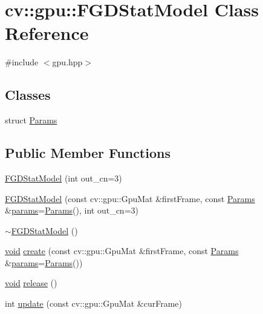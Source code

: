 \hypertarget{classcv_1_1gpu_1_1FGDStatModel}{\section{cv\-:\-:gpu\-:\-:F\-G\-D\-Stat\-Model Class Reference}
\label{classcv_1_1gpu_1_1FGDStatModel}
}


{\ttfamily \#include $<$gpu.\-hpp$>$}

\subsection*{Classes}
\begin{DoxyCompactItemize}
\item 
struct \hyperlink{structcv_1_1gpu_1_1FGDStatModel_1_1Params}{Params}
\end{DoxyCompactItemize}
\subsection*{Public Member Functions}
\begin{DoxyCompactItemize}
\item 
\hyperlink{classcv_1_1gpu_1_1FGDStatModel_a44f2f3e939a21b4978b7399ce706335d}{F\-G\-D\-Stat\-Model} (int out\-\_\-cn=3)
\item 
\hyperlink{classcv_1_1gpu_1_1FGDStatModel_a1941766a912afc498ff76807aa4dad68}{F\-G\-D\-Stat\-Model} (const cv\-::gpu\-::\-Gpu\-Mat \&first\-Frame, const \hyperlink{structcv_1_1gpu_1_1FGDStatModel_1_1Params}{Params} \&\hyperlink{compat_8hpp_a0480a03ecc41b20cde376602531d9270}{params}=\hyperlink{structcv_1_1gpu_1_1FGDStatModel_1_1Params}{Params}(), int out\-\_\-cn=3)
\item 
\hyperlink{classcv_1_1gpu_1_1FGDStatModel_ab2d4c63fcc1df838e6311ac5e423c1b4}{$\sim$\-F\-G\-D\-Stat\-Model} ()
\item 
\hyperlink{legacy_8hpp_a8bb47f092d473522721002c86c13b94e}{void} \hyperlink{classcv_1_1gpu_1_1FGDStatModel_ad01cae89012281d70c63ec698974ce35}{create} (const cv\-::gpu\-::\-Gpu\-Mat \&first\-Frame, const \hyperlink{structcv_1_1gpu_1_1FGDStatModel_1_1Params}{Params} \&\hyperlink{compat_8hpp_a0480a03ecc41b20cde376602531d9270}{params}=\hyperlink{structcv_1_1gpu_1_1FGDStatModel_1_1Params}{Params}())
\item 
\hyperlink{legacy_8hpp_a8bb47f092d473522721002c86c13b94e}{void} \hyperlink{classcv_1_1gpu_1_1FGDStatModel_a16e796b802d2bf74d5591fce51fa91fa}{release} ()
\item 
int \hyperlink{classcv_1_1gpu_1_1FGDStatModel_af488f4b536aa0a287b03205490fd59bc}{update} (const cv\-::gpu\-::\-Gpu\-Mat \&cur\-Frame)
\end{DoxyCompactItemize}
